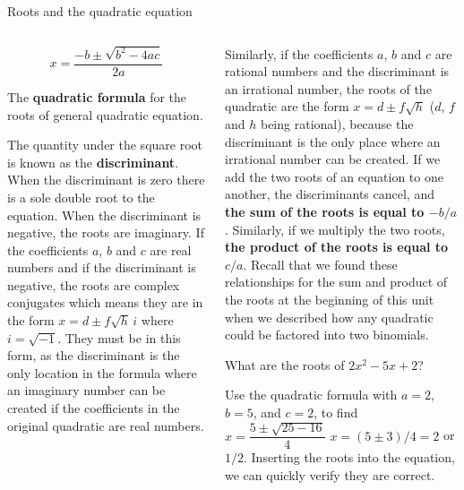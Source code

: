 \documentclass[9pt,aspectratio=169]{beamer}
\begin{document}
\begin{frame}{Roots and the quadratic equation}
  \begin{columns}[T]
    \begin{column}{0.46\textwidth}
      \begin{definition}
        \[ x = \frac{-b \pm \sqrt{b^2 - 4ac}}{2a} \]

        The \textbf{quadratic formula} for the roots of general quadratic equation.
      \end{definition}

      The quantity under the square root is known as the \textbf{discriminant}.  When the discriminant is zero there is a sole double root to the equation.  When the discriminant is negative, the roots are imaginary.  If the coefficients $a$, $b$ and $c$ are real numbers and if the discriminant is negative, the roots are complex conjugates which means they are in the form $x = d \pm f\sqrt{h}\, i$ where $i = \sqrt{-1}$.  They must be in this form, as the discriminant is the only location in the formula where an imaginary number can be created if the coefficients in the original quadratic are real numbers.
    \end{column}
    \begin{column}{0.54\textwidth}
      Similarly, if the coefficients $a$, $b$ and $c$ are rational numbers and the discriminant is an irrational number, the roots of the quadratic are the form $x = d \pm f\sqrt{h}$ ($d$, $f$ and $h$ being rational), because the discriminant is the only place where an irrational number can be created.
      If we add the two roots of an equation to one another, the discriminants cancel, and \textbf{the sum of the roots is equal to $-b/a$}.  Similarly, if we multiply the two roots, \textbf{the product of the roots is equal to $c/a$}.  Recall that we found these relationships for the sum and product of the roots at the beginning of this unit when we described how any quadratic could be factored into two binomials.

      \begin{problem}
        What are the roots of $2x^2 - 5x + 2$?        
      \end{problem}
      
      Use the quadratic formula with $a = 2$, $b = 5$, and $c = 2$, to find $x = \dfrac{5 \pm \sqrt{25 - 16}}{4}$
      $x =(5 \pm 3)/4 = 2$ or $1/2$.  Inserting the roots into the equation, we can quickly verify they are correct.

    \end{column}
  \end{columns}
\end{frame}
\end{document}

